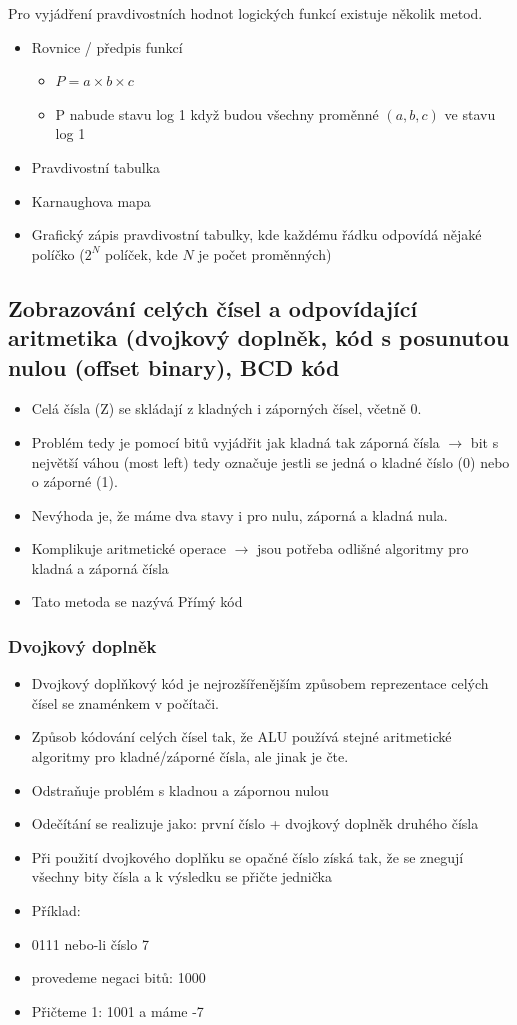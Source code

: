 \documentclass[10pt,a4paper]{article}
\begin{document}
Pro vyjádření pravdivostních hodnot logických funkcí existuje několik metod.


\begin{itemize}
\item Rovnice / předpis funkcí
\begin{itemize}
\item $P = a \times b \times c$
\item P nabude stavu log 1 když budou všechny proměnné $(a,b,c)$ ve stavu log 1
\end{itemize}
\item Pravdivostní tabulka
\item Karnaughova mapa
\item Grafický zápis pravdivostní tabulky, kde každému řádku odpovídá nějaké políčko ($2^N$ políček, kde $N$ je počet proměnných)
\end{itemize}


\subsection{Zobrazování celých čísel a odpovídající aritmetika (dvojkový doplněk, kód s posunutou nulou (offset binary), BCD kód}
\begin{itemize}
\item Celá čísla (Z) se skládají z kladných i záporných čísel, včetně 0.
\item Problém tedy je pomocí bitů vyjádřit jak kladná tak záporná čísla $\rightarrow$ bit s největší váhou (most left) tedy označuje jestli se jedná o kladné číslo (0) nebo o záporné (1).
\item Nevýhoda je, že máme dva stavy i pro nulu, záporná a kladná nula.
\item Komplikuje aritmetické operace $\rightarrow$ jsou potřeba odlišné algoritmy pro kladná a záporná čísla
\item Tato metoda se nazývá Přímý kód
\end{itemize}

\subsubsection{Dvojkový doplněk}
\begin{itemize}
\item Dvojkový doplňkový kód je nejrozšířenějším způsobem reprezentace celých čísel se znaménkem v počítači.
\item Způsob kódování celých čísel tak, že ALU používá stejné aritmetické algoritmy pro kladné/záporné čísla, ale jinak je čte.
\item Odstraňuje problém s kladnou a zápornou nulou
\item Odečítání se realizuje jako: první číslo + dvojkový doplněk druhého čísla
\item Při použití dvojkového doplňku se opačné číslo získá tak, že se znegují všechny bity čísla a k výsledku se přičte jednička
\item Příklad:
\item 0111 nebo-li číslo 7
\item provedeme negaci bitů: 1000
\item Přičteme 1: 1001 a máme -7
\end{itemize}
\end{document}
